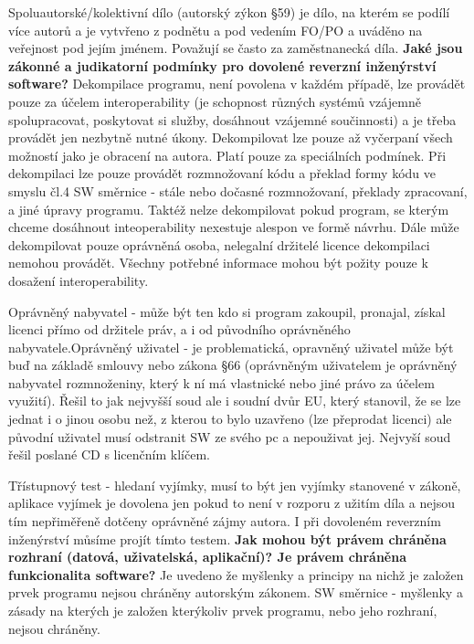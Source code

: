 \documentclass[12pt,a4paper,czech]{report}
\newcommand{\nadpis}[1]{\noindent\textbf{\Large{#1}}\normalsize}
\begin{document}
Spoluautorské/kolektivní dílo (autorský zýkon §59) je dílo, na kterém se podílí více autorů a je vytvřeno z podnětu a pod vedením FO/PO a uváděno na veřejnost pod jejím jménem. Považují se často za zaměstnanecká díla.
\newline
\newline
\nadpis{Jaké jsou zákonné a judikatorní podmínky pro dovolené reverzní inženýrství software?}
\newline
\newline
Dekompilace programu, není povolena v každém případě, lze provádět pouze za účelem interoperability (je schopnost různých systémů vzájemně spolupracovat, poskytovat si služby, dosáhnout vzájemné součinnosti) a je třeba provádět jen nezbytně nutné úkony. Dekompilovat lze pouze až vyčerpaní všech možností jako je obracení na autora. Platí pouze za speciálních podmínek. Při dekompilaci lze pouze provádět rozmnožovaní kódu a překlad formy kódu ve smyslu čl.4 SW směrnice - stále nebo dočasné rozmnožovaní, překlady zpracovaní, a jiné úpravy programu. Taktéž nelze dekompilovat pokud program, se kterým chceme dosáhnout inteoperability nexestuje alespon ve formě návrhu. Dále může dekompilovat pouze oprávněná osoba, nelegalní držitelé licence dekompilaci nemohou provádět. Všechny potřebné informace mohou být požity pouze k dosažení interoperability. 

Oprávněný nabyvatel - může být ten kdo si program zakoupil, pronajal, získal licenci přímo od držitele práv, a i od původního oprávněného nabyvatele.\newline Oprávněný uživatel - je problematická, opravněný uživatel může být buď na základě smlouvy nebo zákona §66 (oprávněným uživatelem je oprávněný nabyvatel rozmnoženiny, který k ní má vlastnické nebo jiné právo za účelem využití). Řešil to jak nejvyšší soud ale i soudní dvůr EU, který stanovil, že se lze jednat i o jinou osobu než, z kterou to bylo uzavřeno (lze přeprodat licenci) ale původní uživatel musí odstranit SW ze svého pc a nepouživat jej. Nejvyší soud řešil poslané CD s licenčním klíčem.

Třístupnový test - hledaní vyjímky, musí to být jen vyjímky stanovené v zákoně, aplikace vyjímek je dovolena jen pokud to není v rozporu z užitím díla a nejsou tím nepřiměřeně dotčeny oprávněné zájmy autora. I při dovoleném reverzním inženýrství můsíme projít tímto testem.
\newline
\newline
\nadpis{Jak mohou být právem chráněna rozhraní (datová, uživatelská, aplikační)? Je právem chráněna funkcionalita software?}
\newline
\newline
Je uvedeno že myšlenky a principy na nichž je založen prvek programu nejsou chráněny autorským zákonem. SW směrnice - myšlenky a zásady na kterých je založen kterýkoliv prvek programu, nebo jeho rozhraní, nejsou chráněny. 
\end{document}
